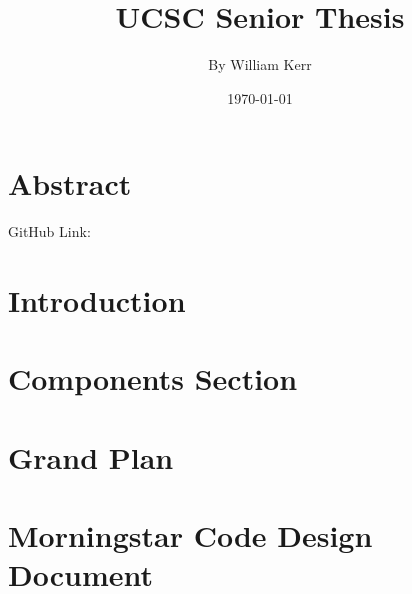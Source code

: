 \documentclass[a4paper,12pt]{report}
\begin{document}

\title{\Large{\textbf{UCSC Senior Thesis}}}
\author{By William Kerr}
\date{\today}

\maketitle %
\tableofcontents %

\setcounter{page}{2} %


\chapter{Abstract}
GitHub Link:

\chapter{Introduction}%



\chapter{Components Section}


\chapter{Grand Plan}


\chapter{Morningstar Code Design Document }

\end{document}
